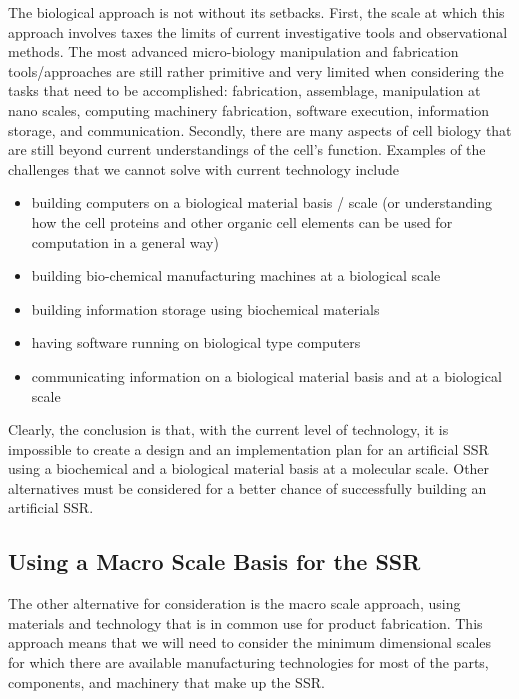The biological approach is not without its setbacks. First, the scale at which this approach involves taxes the limits of current investigative tools and observational methods. The most advanced micro-biology manipulation and fabrication tools/approaches are still rather primitive and very limited when considering the tasks that need to be accomplished: fabrication, assemblage, manipulation at nano scales, computing machinery fabrication, software execution, information storage, and communication. Secondly, there are many aspects of cell biology that are still beyond current understandings of the cell’s function.  Examples of the challenges that we cannot solve with current technology include

\begin{itemize}
\item building computers on a biological material basis / scale (or
understanding how the cell proteins and other organic cell elements can
be used for computation in a general way)
\item building bio-chemical manufacturing machines at a biological
scale
\item building information storage using biochemical materials
\item having software running on biological type computers
\item communicating information on a biological material basis and at a biological scale
\end{itemize}

Clearly, the conclusion is that, with the current level of
technology, it is impossible to create a design and an implementation
plan for an artificial SSR using a biochemical and a biological material
basis at a molecular scale. Other alternatives must be considered for a better
chance of successfully building an artificial SSR.

\subsection{Using a Macro Scale Basis for the SSR}

The other alternative for consideration is the macro scale approach, using materials
and technology that is in common use for product fabrication.
This approach means that we will need to consider the minimum
dimensional scales for which there are available manufacturing
technologies for most of the parts, components, and machinery that make
up the SSR.  


